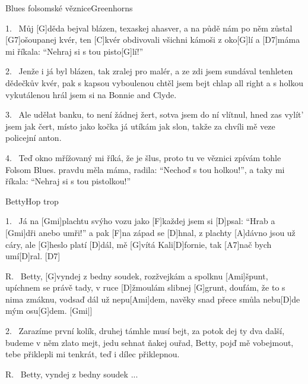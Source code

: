 \begin{song}{Blues folsomské věznice}{Greenhorns}

\begin{xverse}{1.~}
Můj [\large G]děda bejval blázen, texaskej ahasver,
a na půdě nám po něm zůstal [\large G7]ošoupanej kvér,
ten [\large C]kvér obdivovali všichni kámoši z oko[\large G]lí
a [\large D7]máma mi říkala: ``Nehraj si s tou pisto[\large G]lí!''
\end{xverse}

\begin{xverse}{2.~}
Jenže i já byl blázen, tak zralej pro malér,
a ze  zdi jsem sundával tenhleten dědečkův kvér,
pak s kapsou vyboulenou chtěl jsem bejt chlap all right
a s holkou vykutálenou hrál jsem si na Bonnie and Clyde.
\end{xverse}

\begin{xverse}{3.~}
Ale udělat banku, to není žádnej žert,
sotva jsem do ní vlítnul, hned zas vylít' jsem jak čert,
místo jako kočka já utíkám jak slon,
takže za chvíli mě veze policejní anton.
\end{xverse}

\begin{xverse}{4.~}
Teď okno mřížovaný mi říká, že je šlus,
proto tu ve věznici zpívám tohle Folsom Blues.
pravdu měla máma, radila: ``Nechoď s tou holkou!'',
a taky mi říkala: ``Nehraj si s tou pistolkou!''
\end{xverse}

\end{song}

\begin{song}{Betty}{Hop trop}

\begin{xverse}{1.~}
Já na [\large Gmi]plachtu svýho vozu jako [\large F]každej jsem si [\large D]psal:
``Hrab a [\large Gmi]dři anebo umři!'' a pak [\large F]na západ se [\large D]hnal,
z plachty [\large A]dávno jsou už cáry, ale [\large G]heslo platí [\large D]dál,
mě [\large G]vítá Kali[\large D]fornie, tak [\large A7]nač bych umí[\large D]ral. [\large D7]{}
\end{xverse}

\begin{xverse}{R.~}
Betty, [\large G]vyndej z bedny soudek, rozžvejkám a spolknu [\large Ami]{}špunt,
upíchnem se právě tady, v ruce [\large D]{}žmoulám slibnej [\large G]grunt,
doufám, že to s nima zmáknu, vodsaď dál už nepu[\large Ami]dem,
navěky snad přece smůla nebu[\large D]de mým osu[\large G]dem. [\large Gmi|]{}
\end{xverse}

\begin{xverse}{2.~}
Zarazíme první kolík, druhej támhle musí bejt,
za potok dej ty dva další, budeme v něm zlato mejt,
jedu sehnat ňakej ouřad, Betty, pojď mě vobejmout,
tebe přiklepli mi tenkrát, teď i dílec přiklepnou.
\end{xverse}

\begin{xverse}{R.~}
Betty, vyndej z bedny soudek ...
\end{xverse}

\end{song}

